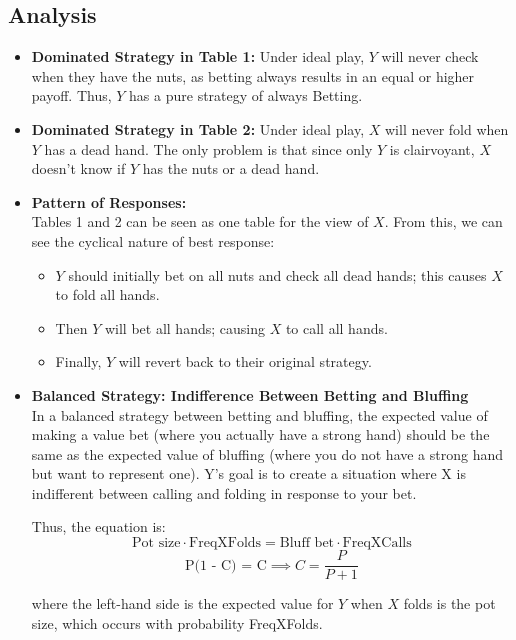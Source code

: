 \documentclass[12pt]{article}
\begin{document}
\subsection*{Analysis}
\begin{itemize}
    \item \textbf{Dominated Strategy in Table 1:} Under ideal play, $Y$ will never check when they have the nuts, as betting always results in an equal or higher payoff. Thus, $Y$ has a pure strategy of always Betting.

    \item \textbf{Dominated Strategy in Table 2:} Under ideal play, $X$ will never fold when $Y$ has a dead hand. The only problem is that since only $Y$ is clairvoyant, $X$ doesn't know if $Y$ has the nuts or a dead hand. 

    \item \textbf{Pattern of Responses:} \vspace{3mm}\\ 
    Tables 1 and 2 can be seen as one table for the view of \(X\). From this, we can see the cyclical nature of best response:  
    \begin{itemize}
        \item \(Y\) should initially bet on all nuts and check all dead hands; this causes \(X\) to fold all hands.
        \item Then \(Y\) will bet all hands; causing \(X\) to call all hands.
        \item Finally, \(Y\) will revert back to their original strategy.
    \end{itemize}

    \item \textbf{Balanced Strategy: Indifference Between Betting and Bluffing} \vspace{3mm}\\
    In a balanced strategy between betting and bluffing, the expected value of making a value bet (where you actually have a strong hand) should be the same as the expected value of bluffing (where you do not have a strong hand but want to represent one). Y's goal is to create a situation where X is indifferent between calling and folding in response to your bet.
    
    Thus, the equation is:  
    \[
    \text{Pot size} \cdot \text{FreqXFolds} = \text{Bluff bet} \cdot \text{FreqXCalls}
    \]
    \[
    \text{P(1~-~C) = C} \implies C = \frac{P}{P+1}
    \]
    
    where the left-hand side is the expected value for \(Y\) when \(X\) folds is the pot size, which occurs with probability FreqXFolds.


\end{itemize}
\end{document}
